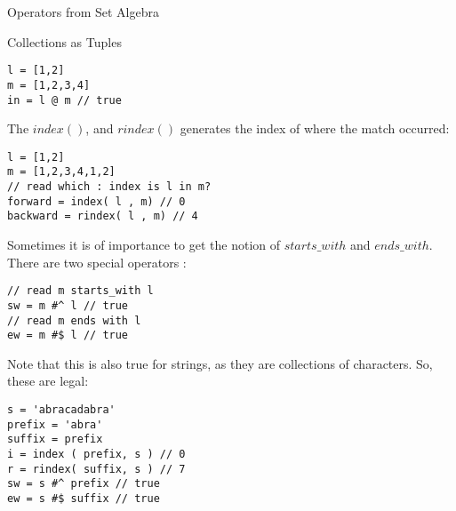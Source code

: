 \begin{section}{Operators from Set Algebra}
\begin{subsection}{Collections as Tuples}
\begin{lstlisting}[style=JexlStyle]
l = [1,2]
m = [1,2,3,4]
in = l @ m // true 
\end{lstlisting}

The $index()$, and $rindex()$ generates the index of where the match occurred:

\begin{lstlisting}[style=JexlStyle]
l = [1,2]
m = [1,2,3,4,1,2]
// read which : index is l in m?
forward = index( l , m) // 0 
backward = rindex( l , m) // 4   
\end{lstlisting}

Sometimes it is of importance to get the notion of $starts\_with$ and $ends\_with$.
There are two special operators :

\begin{lstlisting}[style=JexlStyle]
// read m starts_with l 
sw = m #^ l // true 
// read m ends with l 
ew = m #$ l // true 
\end{lstlisting}

Note that this is also true for strings, as they are collections of characters.
So, these are legal:

\begin{lstlisting}[style=JexlStyle]
s = 'abracadabra'
prefix = 'abra'
suffix = prefix
i = index ( prefix, s ) // 0 
r = rindex( suffix, s ) // 7 
sw = s #^ prefix // true 
ew = s #$ suffix // true 
\end{lstlisting}

\end{subsection}

\end{section}


